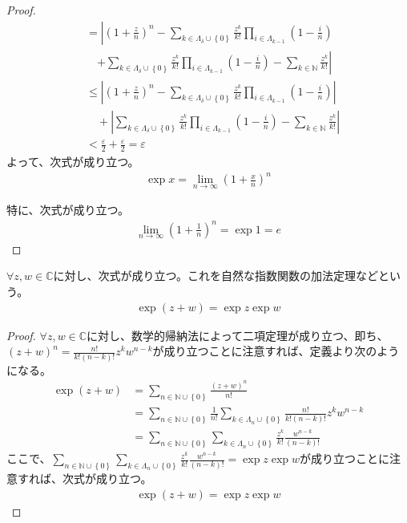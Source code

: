 \documentclass[dvipdfmx]{jsarticle}
\begin{document}
\begin{proof}
\begin{align*}
&= \left| \left( 1 + \frac{z}{n} \right)^{n} - \sum_{k \in \varLambda_{\delta} \cup \left\{ 0 \right\}} {\frac{z^{k}}{k!}\prod_{i \in \varLambda_{k - 1}} \left( 1 - \frac{i}{n} \right)} \right. \\
&\quad \left. + \sum_{k \in \varLambda_{\delta} \cup \left\{ 0 \right\}} {\frac{z^{k}}{k!}\prod_{i \in \varLambda_{k - 1}} \left( 1 - \frac{i}{n} \right)} - \sum_{k \in \mathbb{N}} \frac{z^{k}}{k!} \right|\\
&\leq \left| \left( 1 + \frac{z}{n} \right)^{n} - \sum_{k \in \varLambda_{\delta} \cup \left\{ 0 \right\}} {\frac{z^{k}}{k!}\prod_{i \in \varLambda_{k - 1}} \left( 1 - \frac{i}{n} \right)} \right| \\
&\quad + \left| \sum_{k \in \varLambda_{\delta} \cup \left\{ 0 \right\}} {\frac{z^{k}}{k!}\prod_{i \in \varLambda_{k - 1}} \left( 1 - \frac{i}{n} \right)} - \sum_{k \in \mathbb{N}} \frac{z^{k}}{k!} \right|\\
&< \frac{\varepsilon}{2} + \frac{\varepsilon}{2} = \varepsilon
\end{align*}
よって、次式が成り立つ。
\begin{align*}
\exp x = \lim_{n \rightarrow \infty}\left( 1 + \frac{x}{n} \right)^{n}
\end{align*}\par
特に、次式が成り立つ。
\begin{align*}
\lim_{n \rightarrow \infty}\left( 1 + \frac{1}{n} \right)^{n} = \exp 1 = e
\end{align*}
\end{proof}
\begin{thm}[自然な指数関数の加法定理]\label{4.3.1.4}
$\forall z,w \in \mathbb{C}$に対し、次式が成り立つ。これを自然な指数関数の加法定理などという。
\begin{align*}
\exp(z + w) = \exp z\exp w
\end{align*}
\end{thm}
\begin{proof}
$\forall z,w \in \mathbb{C}$に対し、数学的帰納法によって二項定理が成り立つ、即ち、$(z + w)^{n} = \frac{n!}{k!(n - k)!}z^{k}w^{n - k}$が成り立つことに注意すれば、定義より次のようになる。
\begin{align*}
\exp(z + w) &= \sum_{n \in \mathbb{N} \cup \left\{ 0 \right\}} \frac{(z + w)^{n}}{n!}\\
&= \sum_{n \in \mathbb{N} \cup \left\{ 0 \right\}} {\frac{1}{n!}\sum_{k \in \varLambda_{n} \cup \left\{ 0 \right\}} {\frac{n!}{k!(n - k)!}z^{k}w^{n - k}}}\\
&= \sum_{n \in \mathbb{N} \cup \left\{ 0 \right\}} {\sum_{k \in \varLambda_{n} \cup \left\{ 0 \right\}} {\frac{z^{k}}{k!}\frac{w^{n - k}}{(n - k)!}}}
\end{align*}
ここで、$\sum_{n \in \mathbb{N} \cup \left\{ 0 \right\}} {\sum_{k \in \varLambda_{n} \cup \left\{ 0 \right\}} {\frac{z^{k}}{k!}\frac{w^{n - k}}{(n - k)!}}} = \exp z\exp w$が成り立つことに注意すれば、次式が成り立つ。
\begin{align*}
\exp(z + w) = \exp z\exp w
\end{align*}
\end{proof}
\end{document}
